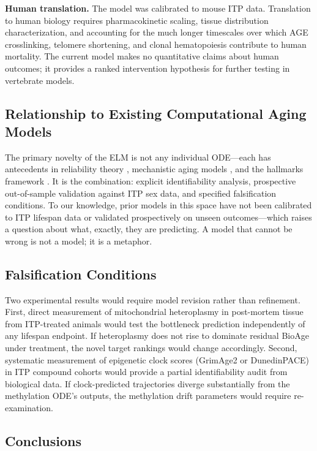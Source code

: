 \documentclass[11pt]{article}
\begin{document}
\textbf{Human translation.} The model was calibrated to mouse ITP data. Translation to human biology requires pharmacokinetic scaling, tissue distribution characterization, and accounting for the much longer timescales over which AGE crosslinking, telomere shortening, and clonal hematopoiesis contribute to human mortality. The current model makes no quantitative claims about human outcomes; it provides a ranked intervention hypothesis for further testing in vertebrate models.

\subsection{Relationship to Existing Computational Aging Models}

The primary novelty of the ELM is not any individual ODE---each has antecedents in reliability theory \citep{Gavrilov2001}, mechanistic aging models \citep{Kowald1993,Kogan2015,Podolskiy2015}, and the hallmarks framework \citep{LopezOtin2013,LopezOtin2023}. It is the combination: explicit identifiability analysis, prospective out-of-sample validation against ITP sex data, and specified falsification conditions. To our knowledge, prior models in this space have not been calibrated to ITP lifespan data or validated prospectively on unseen outcomes---which raises a question about what, exactly, they are predicting. A model that cannot be wrong is not a model; it is a metaphor.

\subsection{Falsification Conditions}

Two experimental results would require model revision rather than refinement. First, direct measurement of mitochondrial heteroplasmy in post-mortem tissue from ITP-treated animals would test the bottleneck prediction independently of any lifespan endpoint. If heteroplasmy does not rise to dominate residual BioAge under treatment, the novel target rankings would change accordingly. Second, systematic measurement of epigenetic clock scores (GrimAge2 or DunedinPACE) in ITP compound cohorts would provide a partial identifiability audit from biological data. If clock-predicted trajectories diverge substantially from the methylation ODE's outputs, the methylation drift parameters would require re-examination.

\subsection{Conclusions}
\end{document}
